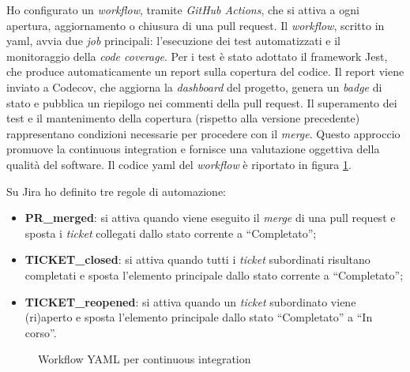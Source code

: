 \par Ho configurato un \textit{workflow}, tramite \textit{GitHub Actions}, che si attiva a ogni apertura, aggiornamento o chiusura di una \gls{pull request}. Il \textit{workflow}, scritto in \gls{yaml}, avvia due \textit{job} principali: l’esecuzione dei test automatizzati e il monitoraggio della \textit{code coverage}. Per i test è stato adottato il \gls{framework} Jest, che produce automaticamente un report sulla copertura del codice. Il report viene inviato a Codecov, che aggiorna la \textit{dashboard} del progetto, genera un \textit{badge} di stato e pubblica un riepilogo nei commenti della \gls{pull request}. Il superamento dei test e il mantenimento della copertura (rispetto alla versione precedente) rappresentano condizioni necessarie per procedere con il \textit{merge}. Questo approccio promuove la \gls{continuous integration} e fornisce una valutazione oggettiva della qualità del software. Il codice \gls{yaml} del \textit{workflow} è riportato in figura \ref{fig:workflow_yaml}.

\vspace{10pt}
\par\noindent Su Jira ho definito tre regole di automazione:
\begin{itemize}
  \item \textbf{PR\_merged}: si attiva quando viene eseguito il \textit{merge} di una \gls{pull request} e sposta i \textit{ticket} collegati dallo stato corrente a “Completato”;
  \item \textbf{TICKET\_closed}: si attiva quando tutti i \textit{ticket} subordinati risultano completati e sposta l'elemento principale dallo stato corrente a “Completato”;
  \item \textbf{TICKET\_reopened}: si attiva quando un \textit{ticket} subordinato viene (ri)aperto e sposta l’elemento principale dallo stato “Completato” a “In corso”.
\end{itemize}

\begin{figure}[H] 
  \centering 
  \caption{Workflow YAML per continuous integration}
  \label{fig:workflow_yaml}
\end{figure}